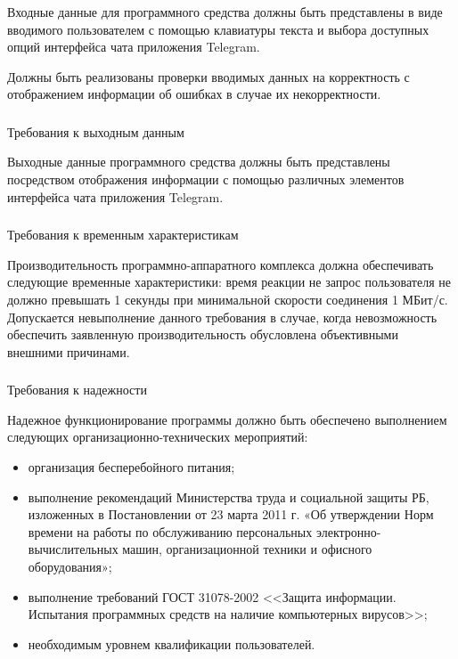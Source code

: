 Входные данные для программного средства должны быть представлены в виде вводимого пользователем с помощью клавиатуры текста и выбора доступных опций интерфейса чата приложения Telegram.

Должны быть реализованы проверки вводимых данных на корректность с отображением информации об ошибках в случае их некорректности.

\subsubsection{} Требования к выходным данным
\label{sec:analysis:specification:outputs}

Выходные данные программного средства должны быть представлены посредством отображения информации с помощью различных элементов интерфейса чата приложения Telegram.

\subsubsection{} Требования к временным характеристикам
\label{sec:analysis:specification:timing}

Производительность программно-аппаратного комплекса должна обеспечивать следующие временные характеристики: время реакции не запрос пользователя не должно превышать 1 секунды при минимальной скорости соединения 1 МБит/с. Допускается невыполнение данного требования в случае, когда невозможность обеспечить заявленную производительность обусловлена объективными внешними причинами.

\subsubsection{} Требования к надежности
\label{sec:analysis:specification:reliability}

Надежное функционирование программы должно быть обеспечено выполнением следующих организационно-технических мероприятий:

\begin{itemize}
	\item организация бесперебойного питания;
	\item выполнение рекомендаций Министерства труда и социальной защиты РБ, изложенных в Постановлении от 23 марта 2011 г. «Об утверждении Норм времени на работы по обслуживанию персональных электронно-вычислитель\-ных машин, организационной техники и офисного оборудования»;
	\item выполнение требований ГОСТ 31078-2002 <<Защита информации. Испытания программных средств на наличие компьютерных вирусов>>;
	\item необходимым уровнем квалификации пользователей.
\end{itemize}

